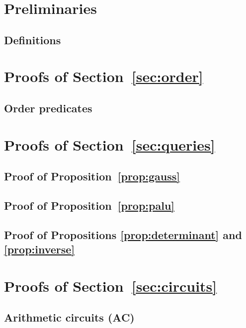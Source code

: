 
\section{Preliminaries}

\subsection{Definitions}



\section{Proofs of Section~\ref{sec:order}}

\subsection{Order predicates}



\section{Proofs of Section~\ref{sec:queries}}

\subsection{Proof of Proposition~\ref{prop:gauss}}


\subsection{Proof of Proposition~\ref{prop:palu}}


\subsection{Proof of Propositions \ref{prop:determinant} and \ref{prop:inverse}}



\section{Proofs of Section~\ref{sec:circuits}}

\subsection{Arithmetic circuits (AC)}


